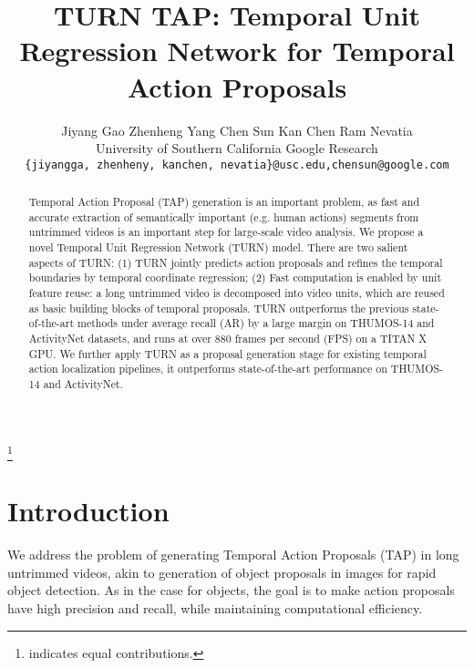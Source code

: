 \documentclass[10pt,twocolumn,letterpaper]{article}
\begin{document}
\title{TURN TAP: Temporal Unit Regression Network for Temporal Action Proposals}

\author{Jiyang Gao \quad Zhenheng Yang \quad Chen Sun  \quad Kan Chen \quad Ram Nevatia \\
University of Southern California \qquad Google Research \\
{\tt\small \{jiyangga, zhenheny, kanchen, nevatia\}@usc.edu,\quad chensun@google.com} 
}

\maketitle

\newcommand\blfootnote[1]{\begingroup
  \renewcommand\thefootnote{}\footnote{#1}\addtocounter{footnote}{-1}\endgroup
}

\blfootnote{ indicates equal contributions.}


\begin{abstract}
  Temporal Action Proposal (TAP) generation is an important problem, as fast and accurate extraction of semantically important (e.g. human actions) segments from untrimmed videos is an important step for large-scale video analysis. We propose a novel Temporal Unit Regression Network (TURN) model. There are two salient aspects of TURN: (1) TURN jointly predicts action proposals and refines the temporal boundaries by temporal coordinate regression; (2) Fast computation is enabled by unit feature reuse: a long untrimmed video is decomposed into video units, which are reused as basic building blocks of temporal proposals. TURN outperforms the previous state-of-the-art methods under average recall (AR) by a large margin on THUMOS-14 and ActivityNet datasets, and runs at over 880 frames per second (FPS) on a TITAN X GPU. We further apply TURN as a proposal generation stage for existing temporal action localization pipelines, it outperforms state-of-the-art performance on THUMOS-14 and ActivityNet. \end{abstract}

\section{Introduction}



We address the problem of generating Temporal Action Proposals (TAP) in long untrimmed videos, akin to generation of object proposals in images for rapid object detection. As in the case for objects, the goal is to make action proposals have high precision and recall, while maintaining computational efficiency. 
\end{document}
